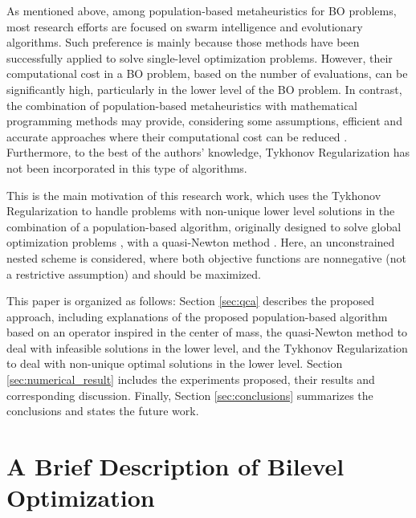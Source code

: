 \documentclass[conference]{IEEEtran}
\theoremstyle{definition}
\begin{document}
As mentioned above, among population-based metaheuristics for BO problems, most
research efforts are focused on swarm intelligence and evolutionary algorithms.
Such preference is mainly because those methods have been successfully applied
to solve single-level optimization problems. However, their computational cost
in a BO problem, based on the number of evaluations, can be significantly high,
particularly in the lower level of the BO problem. In contrast, the combination
of population-based metaheuristics with mathematical programming methods may
provide, considering some assumptions, efficient and accurate approaches where
their computational cost can be reduced \cite{sinha2013efficient,wang2005evolutionary}.
Furthermore, to the best of the authors' knowledge, Tykhonov Regularization has
not been incorporated in this type of algorithms. 

This is the main motivation of this research work, which uses the Tykhonov
Regularization \cite{dempe2002foundations} to handle problems with non-unique
lower level solutions in the combination of a population-based algorithm, originally
designed to solve global optimization problems \cite{Mejia2018}, with a quasi-Newton
method \cite{fletcher2013practical}. Here, an unconstrained nested scheme is
considered, where both objective functions are nonnegative (not a restrictive
assumption) and should be maximized.

This paper is organized as follows: Section \ref{sec:qca} describes the proposed
approach, including explanations of the proposed population-based algorithm based
on an operator inspired in the center of mass, the quasi-Newton method to deal
with infeasible solutions in the lower level, and the Tykhonov Regularization to
deal with non-unique optimal solutions in the lower level. Section \ref{sec:numerical_result}
includes the experiments proposed, their results and corresponding discussion.
Finally, Section \ref{sec:conclusions} summarizes the conclusions and states
the future work.


\section{A Brief Description of Bilevel Optimization} %
\label{sec:a_brief_description_of_bilevel_optimization}
\end{document}
